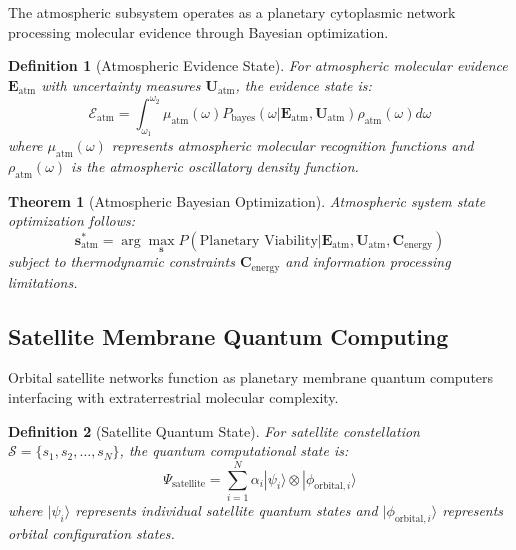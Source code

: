 \documentclass[12pt,a4paper]{article}
\newtheorem{theorem}{Theorem}
\newtheorem{definition}{Definition}
\begin{document}
The atmospheric subsystem operates as a planetary cytoplasmic network processing molecular evidence through Bayesian optimization.

\begin{definition}[Atmospheric Evidence State]
For atmospheric molecular evidence $\mathbf{E}_{\text{atm}}$ with uncertainty measures $\mathbf{U}_{\text{atm}}$, the evidence state is:
\begin{equation}
\mathcal{E}_{\text{atm}} = \int_{\omega_1}^{\omega_2} \mu_{\text{atm}}(\omega) P_{\text{bayes}}(\omega | \mathbf{E}_{\text{atm}}, \mathbf{U}_{\text{atm}}) \rho_{\text{atm}}(\omega) d\omega
\end{equation}
where $\mu_{\text{atm}}(\omega)$ represents atmospheric molecular recognition functions and $\rho_{\text{atm}}(\omega)$ is the atmospheric oscillatory density function.
\end{definition}

\begin{theorem}[Atmospheric Bayesian Optimization]
Atmospheric system state optimization follows:
\begin{equation}
\mathbf{s}^*_{\text{atm}} = \arg\max_{\mathbf{s}} P(\text{Planetary Viability} | \mathbf{E}_{\text{atm}}, \mathbf{U}_{\text{atm}}, \mathbf{C}_{\text{energy}})
\end{equation}
subject to thermodynamic constraints $\mathbf{C}_{\text{energy}}$ and information processing limitations.
\end{theorem}

\subsection{Satellite Membrane Quantum Computing}

Orbital satellite networks function as planetary membrane quantum computers interfacing with extraterrestrial molecular complexity.

\begin{definition}[Satellite Quantum State]
For satellite constellation $\mathcal{S} = \{s_1, s_2, \ldots, s_N\}$, the quantum computational state is:
\begin{equation}
\Psi_{\text{satellite}} = \sum_{i=1}^N \alpha_i |\psi_i\rangle \otimes |\phi_{\text{orbital},i}\rangle
\end{equation}
where $|\psi_i\rangle$ represents individual satellite quantum states and $|\phi_{\text{orbital},i}\rangle$ represents orbital configuration states.
\end{definition}
\end{document}
